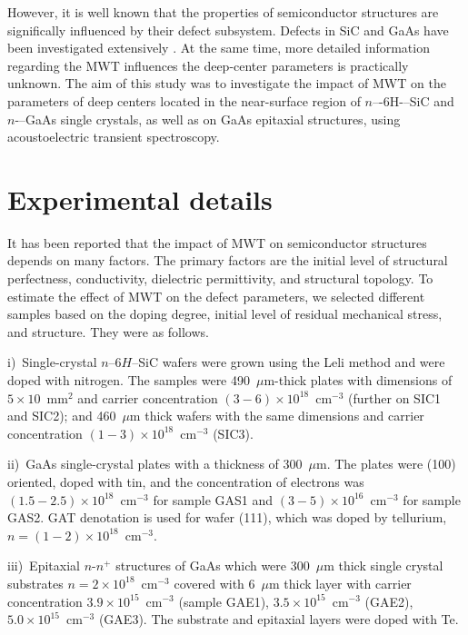 \documentclass[10pt]{iopart}
\begin{document}
However, it is well known that the properties of semiconductor structures are significally influenced by their defect subsystem.
Defects in SiC and GaAs have been investigated extensively \cite{SiCDavid,SiCWei,GAPel2020,GASobolev2020}.
At the same time,
more detailed information regarding the MWT influences the deep-center parameters is practically unknown.
The aim of this study was to investigate the impact of MWT on the parameters of deep centers located in the near-surface region of $n$–-6H-–SiC and $n$-–GaAs single crystals,
as well as on  GaAs  epitaxial structures, using acoustoelectric  transient spectroscopy.

\section{Experimental details}\label{sec:Exp}

It has been reported \cite{BoltovetsEn,Milenin1994En,BelyaevIntac,ASHKINADZE1996,ProcSPIE} that
the impact of MWT on semiconductor structures depends on many factors.
The primary factors are the initial level of structural perfectness, conductivity, dielectric permittivity, and structural topology.
To estimate the effect of MWT on the defect parameters, we selected different samples based on the doping degree, initial level of residual mechanical stress, and structure.
They were as follows.

\noindent
i)~Single-crystal $n$--6$H$--SiC wafers were grown using the Leli method and were doped with nitrogen.
   The samples were  490~$\mu$m-thick plates with dimensions of $5\times10$~mm$^2$ and  carrier concentration $(3-6)\times10^{18}$~cm$^{-3}$
    (further on SIC1 and SIC2);
    and 460~$\mu$m thick wafers with the same dimensions and carrier concentration  $(1-3)\times10^{18}$~cm$^{-3}$ (SIC3).

\noindent
ii)~GaAs single-crystal plates with a thickness of 300~$\mu$m.
   The plates were (100) oriented, doped with tin, and the concentration of electrons was $(1.5-2.5)\times10^{18}$~cm$^{-3}$
   for sample  GAS1 and $(3-5)\times10^{16}$~cm$^{-3}$ for sample GAS2.
   GAT denotation is used for wafer (111), which was doped by tellurium,
   $n = (1-2)\times10^{18}$~cm$^{-3}$.

\noindent
iii)~Epitaxial $n$-$n^+$ structures of GaAs which were 300~$\mu$m thick single crystal substrates $n = 2 \times10^{18}$~cm$^{-3}$
   covered with 6~$\mu$m thick layer with carrier concentration $3.9\times10^{15}$~cm$^{-3}$
   (sample GAE1), $3.5\times10^{15}$~cm$^{-3}$ (GAE2),
   $5.0\times10^{15}$~cm$^{-3}$ (GAE3).
   The substrate and epitaxial layers were doped with Te.
\end{document}
